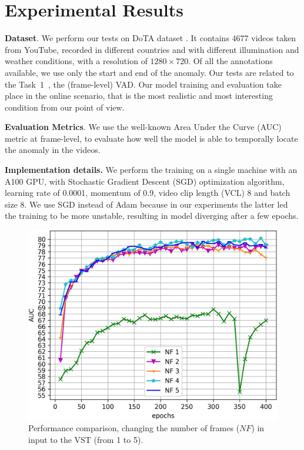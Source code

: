 \section{Experimental Results}
\label{sec:experiments}


\noindent\textbf{Dataset}.
We perform our tests on DoTA dataset \cite{9712446}.
It contains 4677 videos taken from YouTube, recorded in different countries and with different illumination and weather conditions, with a resolution of $1280 \times 720$.
Of all the annotations available, we use only the start and end of the anomaly.
Our tests are related to the Task~1~\cite{9712446}, the (frame-level) VAD.
Our model training and evaluation take place in the online scenario, that is the most realistic and most interesting condition from our point of view.

\noindent\textbf{Evaluation Metrics}.
We use the well-known Area Under the Curve (AUC) metric at frame-level, to evaluate how well the model is able to temporally locate the anomaly in the videos.

\noindent\textbf{Implementation details.}
We perform the training on a single machine with an A100 GPU\@, with Stochastic Gradient Descent (SGD) optimization algorithm, learning rate of 0.0001, momentum of 0.9, video clip length (VCL) 8 and batch size 8.
We use SGD instead of Adam because in our experiments the latter led the training to be more unstable, resulting in model diverging after a few epochs.

\newcommand{\figsize}{0.7\columnwidth}

\begin{figure}[ht!]
\centerline{\includegraphics[clip,width=\figsize]{images/exp_1.jpg}}
	\caption{Performance comparison, changing the number of frames ($\mathit{NF}$) in input to the VST (from 1 to 5).}
	\label{fig:num-frames-vst}
\end{figure}


